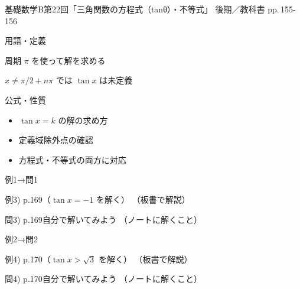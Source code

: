 \documentclass[aspectratio=43,professionalfonts,handout]{beamer}
\newcommand{\LectureNum}{22}
\newcommand{\LectureTitle}{三角関数の方程式（tanθ）・不等式}
\newcommand{\TextPages}{pp.\,155-156}
\newcommand{\CourseName}{基礎数学B}
\renewcommand{\TermName}{後期}
\begin{document}
\begin{frame}{\CourseName\quad 第\LectureNum 回「\LectureTitle 」}
  {\small \TermName\quad \TeacherName\quad ／\quad 教科書 \TextPages}

  \begin{block}{用語・定義}
  \begin{description}[labelwidth=5.5em]
    \item[\kw{$\tan x = k$ の解：$x = \alpha$ と $x = \alpha + \pi$}] 周期 $\pi$ を使って解を求める
    \item[\kw{$\tan x$ の定義域に注意（$x \neq \pi/2 + n\pi$）}] $x \neq \pi/2 + n\pi$ では $\tan x$ は未定義
  \end{description}
  \end{block}
\end{frame}

\begin{frame}{公式・性質}
  \begin{block}{}
  \begin{itemize}
    \item $\tan x = k$ の解の求め方
    \item 定義域除外点の確認
    \item 方程式・不等式の両方に対応
  \end{itemize}
  \end{block}
\end{frame}

\begin{frame}{例1→問1}
  \begin{exampleblock}{例3) p.169（$\tan x = -1$ を解く）}
    （板書で解説）
  \end{exampleblock}

  \vfill

  \begin{block}{問3) p.169\quad 自分で解いてみよう}
    （ノートに解くこと）
  \end{block}
\end{frame}

\begin{frame}{例2→問2}
  \begin{exampleblock}{例4) p.170（$\tan x > \sqrt{3}$ を解く）}
    （板書で解説）
  \end{exampleblock}

  \vfill

  \begin{block}{問4) p.170\quad 自分で解いてみよう}
    （ノートに解くこと）
  \end{block}
\end{frame}
\end{document}
